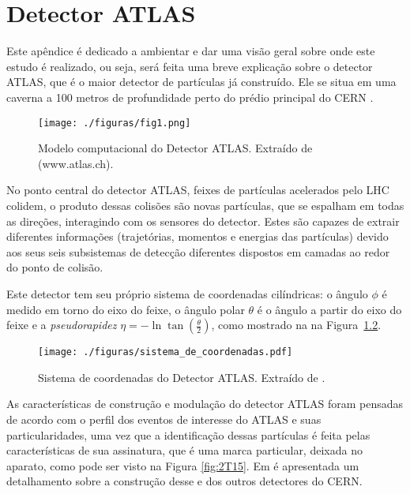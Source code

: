 %
%

\chapter{Detector ATLAS}\label{sec:apendiceAtlas}

Este apêndice é dedicado a ambientar e dar uma visão geral sobre onde este estudo é realizado, ou seja, será feita uma breve explicação sobre o detector ATLAS, que é o maior detector de partículas já construído. Ele se situa em uma caverna a 100 metros de profundidade perto do prédio principal do CERN \cite{cernwebAtlas}.

\begin{figure}[!h]
	\centering
	\texttt{[image: ./figuras/fig1.png]}\\
	\caption{Modelo computacional do Detector ATLAS. Extraído de (www.atlas.ch).}
	\label{fig:2T05}
\end{figure}

No ponto central do detector ATLAS, feixes de partículas acelerados pelo \ac{LHC} colidem, o produto dessas colisões são novas partículas, que se espalham em todas as direções, interagindo com os sensores do detector. Estes são capazes de extrair diferentes informações (trajetórias, momentos e energias das partículas) devido aos seus seis subsistemas de detecção diferentes dispostos em camadas ao redor do ponto de colisão.

Este detector tem seu próprio sistema de coordenadas cilíndricas: o ângulo $\phi$ é medido em torno do eixo do feixe, o ângulo polar $\theta$ é o ângulo a partir do eixo do feixe \cite{aad2008atlas} e a \emph{pseudorapidez} $\eta  =  - \ln \tan \left( {\frac{\theta }{2}} \right)$, como mostrado na na Figura~\ref{fig:2T07}.

\begin{figure}[!h]
	\centering
	\texttt{[image: ./figuras/sistema\_de\_coordenadas.pdf]}\\
	\caption{Sistema de coordenadas do Detector ATLAS. Extraído de \cite{dos2006sistema}.}
	\label{fig:2T07}
\end{figure}

As características de construção e modulação do detector ATLAS foram pensadas de acordo com o perfil dos eventos de interesse do ATLAS e suas particularidades, uma vez que a identificação dessas partículas é feita pelas características de sua assinatura, que é uma marca particular, deixada no aparato, como pode ser visto na Figura \ref{fig:2T15}. Em \cite{Lippmann:2011bb} é apresentada um detalhamento sobre a construção desse e dos outros detectores do CERN.

